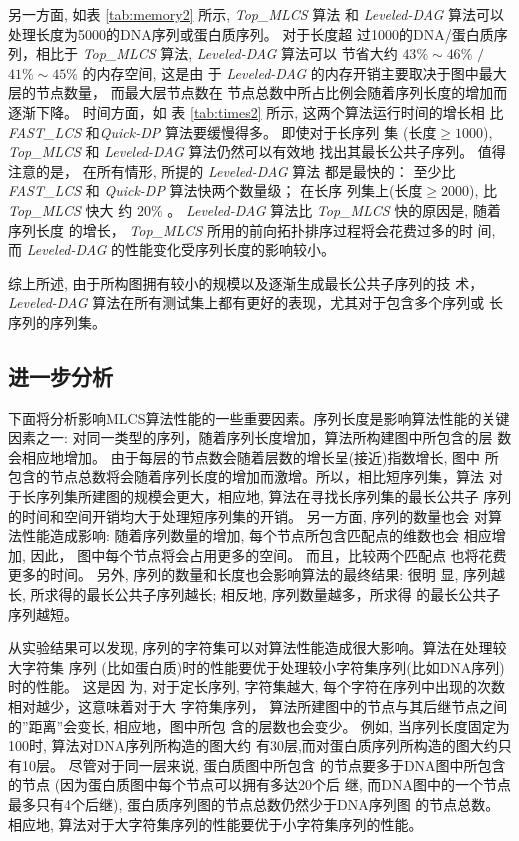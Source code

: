 另一方面, 如表 \ref{tab:memory2} 所示, \emph{Top\_MLCS} 算法
和 \emph{Leveled-DAG} 算法可以处理长度为5000的DNA序列或蛋白质序列。 对于长度超
过1000的DNA/蛋白质序列，相比于 \emph{Top\_MLCS} 算法, \emph{Leveled-DAG} 算法可以
节省大约 $43\% \sim 46\%$ $/$ $41\% \sim 45\%$ 的内存空间, 这是由
于 \emph{Leveled-DAG} 的内存开销主要取决于图中最大层的节点数量， 而最大层节点数在
节点总数中所占比例会随着序列长度的增加而逐渐下降。 时间方面，如
表 \ref{tab:times2} 所示, 这两个算法运行时间的增长相
比 \emph{FAST\_LCS} 和\emph{Quick-DP} 算法要缓慢得多。 即使对于长序列
集 ($长度 \geq 1000$), \emph{Top\_MLCS} 和 \emph{Leveled-DAG} 算法仍然可以有效地
找出其最长公共子序列。 值得注意的是， 在所有情形, 所提的 \emph{Leveled-DAG} 算法
都是最快的： 至少比 \emph{FAST\_LCS} 和 \emph{Quick-DP} 算法快两个数量级； 在长序
列集上($长度 \geq 2000$), 比 \emph{Top\_MLCS} 快大
约 $20\%$ 。 \emph{Leveled-DAG} 算法比 \emph{Top\_MLCS} 快的原因是, 随着序列长度
的增长， \emph{Top\_MLCS} 所用的前向拓扑排序过程将会花费过多的时
间, 而 \emph{Leveled-DAG} 的性能变化受序列长度的影响较小。

综上所述, 由于所构图拥有较小的规模以及逐渐生成最长公共子序列的技
术， \emph{Leveled-DAG} 算法在所有测试集上都有更好的表现，尤其对于包含多个序列或
长序列的序列集。

\subsection{进一步分析}

下面将分析影响MLCS算法性能的一些重要因素。序列长度是影响算法性能的关键
因素之一: 对同一类型的序列，随着序列长度增加，算法所构建图中所包含的层
数会相应地增加。 由于每层的节点数会随着层数的增长呈(接近)指数增长, 图中
所包含的节点总数将会随着序列长度的增加而激增。所以，相比短序列集，算法
对于长序列集所建图的规模会更大，相应地, 算法在寻找长序列集的最长公共子
序列的时间和空间开销均大于处理短序列集的开销。 另一方面, 序列的数量也会
对算法性能造成影响: 随着序列数量的增加, 每个节点所包含匹配点的维数也会
相应增加, 因此， 图中每个节点将会占用更多的空间。 而且，比较两个匹配点
也将花费更多的时间。 另外, 序列的数量和长度也会影响算法的最终结果: 很明
显, 序列越长, 所求得的最长公共子序列越长; 相反地, 序列数量越多，所求得
的最长公共子序列越短。

从实验结果可以发现, 序列的字符集可以对算法性能造成很大影响。算法在处理较大字符集
序列 (比如蛋白质)时的性能要优于处理较小字符集序列(比如DNA序列)时的性能。 这是因
为, 对于定长序列, 字符集越大, 每个字符在序列中出现的次数相对越少，这意味着对于大
字符集序列， 算法所建图中的节点与其后继节点之间的''距离''会变长, 相应地，图中所包
含的层数也会变少。 例如, 当序列长度固定为100时, 算法对DNA序列所构造的图大约
有30层,而对蛋白质序列所构造的图大约只有10层。 尽管对于同一层来说, 蛋白质图中所包含
的节点要多于DNA图中所包含的节点 (因为蛋白质图中每个节点可以拥有多达20个后
继, 而DNA图中的一个节点最多只有4个后继), 蛋白质序列图的节点总数仍然少于DNA序列图
的节点总数。 相应地, 算法对于大字符集序列的性能要优于小字符集序列的性能。

